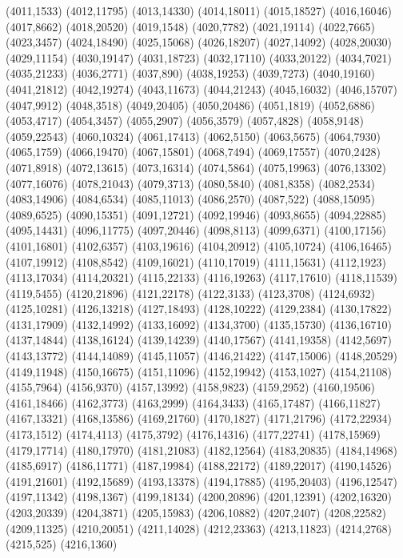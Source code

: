 (4011,1533)
(4012,11795)
(4013,14330)
(4014,18011)
(4015,18527)
(4016,16046)
(4017,8662)
(4018,20520)
(4019,1548)
(4020,7782)
(4021,19114)
(4022,7665)
(4023,3457)
(4024,18490)
(4025,15068)
(4026,18207)
(4027,14092)
(4028,20030)
(4029,11154)
(4030,19147)
(4031,18723)
(4032,17110)
(4033,20122)
(4034,7021)
(4035,21233)
(4036,2771)
(4037,890)
(4038,19253)
(4039,7273)
(4040,19160)
(4041,21812)
(4042,19274)
(4043,11673)
(4044,21243)
(4045,16032)
(4046,15707)
(4047,9912)
(4048,3518)
(4049,20405)
(4050,20486)
(4051,1819)
(4052,6886)
(4053,4717)
(4054,3457)
(4055,2907)
(4056,3579)
(4057,4828)
(4058,9148)
(4059,22543)
(4060,10324)
(4061,17413)
(4062,5150)
(4063,5675)
(4064,7930)
(4065,1759)
(4066,19470)
(4067,15801)
(4068,7494)
(4069,17557)
(4070,2428)
(4071,8918)
(4072,13615)
(4073,16314)
(4074,5864)
(4075,19963)
(4076,13302)
(4077,16076)
(4078,21043)
(4079,3713)
(4080,5840)
(4081,8358)
(4082,2534)
(4083,14906)
(4084,6534)
(4085,11013)
(4086,2570)
(4087,522)
(4088,15095)
(4089,6525)
(4090,15351)
(4091,12721)
(4092,19946)
(4093,8655)
(4094,22885)
(4095,14431)
(4096,11775)
(4097,20446)
(4098,8113)
(4099,6371)
(4100,17156)
(4101,16801)
(4102,6357)
(4103,19616)
(4104,20912)
(4105,10724)
(4106,16465)
(4107,19912)
(4108,8542)
(4109,16021)
(4110,17019)
(4111,15631)
(4112,1923)
(4113,17034)
(4114,20321)
(4115,22133)
(4116,19263)
(4117,17610)
(4118,11539)
(4119,5455)
(4120,21896)
(4121,22178)
(4122,3133)
(4123,3708)
(4124,6932)
(4125,10281)
(4126,13218)
(4127,18493)
(4128,10222)
(4129,2384)
(4130,17822)
(4131,17909)
(4132,14992)
(4133,16092)
(4134,3700)
(4135,15730)
(4136,16710)
(4137,14844)
(4138,16124)
(4139,14239)
(4140,17567)
(4141,19358)
(4142,5697)
(4143,13772)
(4144,14089)
(4145,11057)
(4146,21422)
(4147,15006)
(4148,20529)
(4149,11948)
(4150,16675)
(4151,11096)
(4152,19942)
(4153,1027)
(4154,21108)
(4155,7964)
(4156,9370)
(4157,13992)
(4158,9823)
(4159,2952)
(4160,19506)
(4161,18466)
(4162,3773)
(4163,2999)
(4164,3433)
(4165,17487)
(4166,11827)
(4167,13321)
(4168,13586)
(4169,21760)
(4170,1827)
(4171,21796)
(4172,22934)
(4173,1512)
(4174,4113)
(4175,3792)
(4176,14316)
(4177,22741)
(4178,15969)
(4179,17714)
(4180,17970)
(4181,21083)
(4182,12564)
(4183,20835)
(4184,14968)
(4185,6917)
(4186,11771)
(4187,19984)
(4188,22172)
(4189,22017)
(4190,14526)
(4191,21601)
(4192,15689)
(4193,13378)
(4194,17885)
(4195,20403)
(4196,12547)
(4197,11342)
(4198,1367)
(4199,18134)
(4200,20896)
(4201,12391)
(4202,16320)
(4203,20339)
(4204,3871)
(4205,15983)
(4206,10882)
(4207,2407)
(4208,22582)
(4209,11325)
(4210,20051)
(4211,14028)
(4212,23363)
(4213,11823)
(4214,2768)
(4215,525)
(4216,1360)
